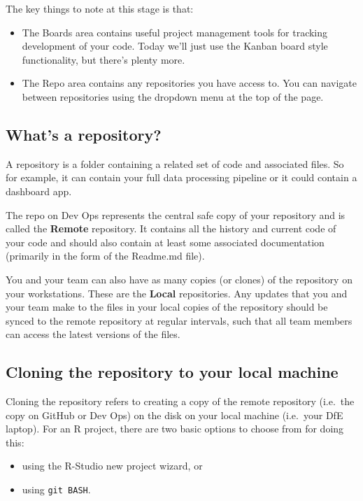 \documentclass[
  12pt,
]{article}
\providecommand{\tightlist}{%
  \setlength{\itemsep}{0pt}\setlength{\parskip}{0pt}}
\begin{document}
The key things to note at this stage is that:

\begin{itemize}
\tightlist
\item
  The Boards area contains useful project management tools for tracking
  development of your code. Today we'll just use the Kanban board style
  functionality, but there's plenty more.
\item
  The Repo area contains any repositories you have access to. You can
  navigate between repositories using the dropdown menu at the top of
  the page.
\end{itemize}

\hypertarget{whats-a-repository}{%
\subsection{What's a repository?}\label{whats-a-repository}}

A repository is a folder containing a related set of code and associated
files. So for example, it can contain your full data processing pipeline
or it could contain a dashboard app.

The repo on Dev Ops represents the central safe copy of your repository
and is called the \textbf{Remote} repository. It contains all the
history and current code of your code and should also contain at least
some associated documentation (primarily in the form of the Readme.md
file).

You and your team can also have as many copies (or clones) of the
repository on your workstations. These are the \textbf{Local}
repositories. Any updates that you and your team make to the files in
your local copies of the repository should be synced to the remote
repository at regular intervals, such that all team members can access
the latest versions of the files.

\hypertarget{cloning-the-repository-to-your-local-machine}{%
\subsection{Cloning the repository to your local
machine}\label{cloning-the-repository-to-your-local-machine}}

Cloning the repository refers to creating a copy of the remote
repository (i.e.~the copy on GitHub or Dev Ops) on the disk on your
local machine (i.e.~your DfE laptop). For an R project, there are two
basic options to choose from for doing this:

\begin{itemize}
\tightlist
\item
  using the R-Studio new project wizard, or
\item
  using \texttt{git\ BASH}.
\end{itemize}
\end{document}
